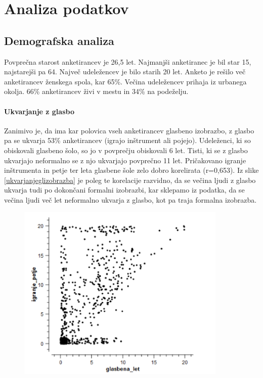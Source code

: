 \documentclass[a4paper, 12pt]{book}
\begin{document}
{\begin{table}[H]
\begin{center}
\begin{tabular}{| p{3.5cm} | p{4.5cm} | p{4.5cm} |}
\end{tabular}
\label{drugidel}
\end{center}
\end{table}

\section{Analiza podatkov}

\subsection{Demografska analiza}

Povprečna starost anketirancev je 26,5 let. Najmanjši anketiranec je bil star 15, najstarejši pa 64. Največ udeležencev je bilo starih 20 let. Anketo je rešilo več anketirancev ženskega spola, kar 65\%. Večina udeležencev prihaja iz urbanega okolja. 66\% anketirancev živi v mestu in 34\% na podeželju.

\paragraph{Ukvarjanje z glasbo}

Zanimivo je, da ima kar polovica vseh anketirancev glasbeno izobrazbo, z glasbo pa se ukvarja 53\% anketirancev (igrajo inštrument ali pojejo). Udeleženci, ki so obiskovali glasbeno šolo, so jo v povprečju obiskovali 6 let. Tisti, ki se z glasbo ukvarjajo neformalno se z njo ukvarjajo povprečno 11 let. Pričakovano igranje inštrumenta in petje ter leta glasbene šole zelo dobro korelirata (r=0,653). Iz slike \ref{ukvarjanjeglizobrazba} je poleg te korelacije razvidno, da se večina ljudi z glasbo ukvarja tudi po dokončani formalni izobrazbi, kar sklepamo iz podatka, da se večina ljudi več let neformalno ukvarja z glasbo, kot pa traja formalna izobrazba. 

\begin{figure}[hbt]
\centering
\includegraphics[width=10cm]{images/izobrazba_ukvarjanje.png}


\end{figure}}
\end{document}
